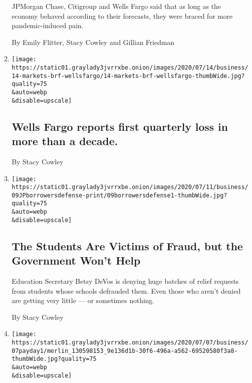 \begin{enumerate}
  JPMorgan Chase, Citigroup and Wells Fargo said that as long as the
  economy behaved according to their forecasts, they were braced for
  more pandemic-induced pain.

  By Emily Flitter, Stacy Cowley and Gillian Friedman
\item
  \href{/2020/07/14/business/wells-fargo-reports-first-quarterly-loss-in-more-than-a-decade.html}{}

  \texttt{[image: https://static01.graylady3jvrrxbe.onion/images/2020/07/14/business/14-markets-brf-wellsfargo/14-markets-brf-wellsfargo-thumbWide.jpg?quality=75\\\&auto=webp\\\&disable=upscale]}

  \hypertarget{wells-fargo-reports-first-quarterly-loss-in-more-than-a-decade}{%
  \subsection{Wells Fargo reports first quarterly loss in more than a
  decade.}\label{wells-fargo-reports-first-quarterly-loss-in-more-than-a-decade}}

  By Stacy Cowley
\item
  \href{/2020/07/10/business/student-loans-betsy-devos-borrower-defense.html}{}

  \texttt{[image: https://static01.graylady3jvrrxbe.onion/images/2020/07/11/business/09JPborrowersdefense-print/09borrowersdefense1-thumbWide.jpg?quality=75\\\&auto=webp\\\&disable=upscale]}

  \hypertarget{the-students-are-victims-of-fraud-but-the-government-wont-help}{%
  \subsection{The Students Are Victims of Fraud, but the Government
  Won't
  Help}\label{the-students-are-victims-of-fraud-but-the-government-wont-help}}

  Education Secretary Betsy DeVos is denying huge batches of relief
  requests from students whose schools defrauded them. Even those who
  aren't denied are getting very little --- or sometimes nothing.

  By Stacy Cowley
\item
  \href{/2020/07/07/business/payday-consumer-financial-protection-bureau.html}{}

  \texttt{[image: https://static01.graylady3jvrrxbe.onion/images/2020/07/07/business/07payday1/merlin\_130598153\_9e136d1b-30f6-496a-a562-69520580f3a8-thumbWide.jpg?quality=75\\\&auto=webp\\\&disable=upscale]}


\end{enumerate}
